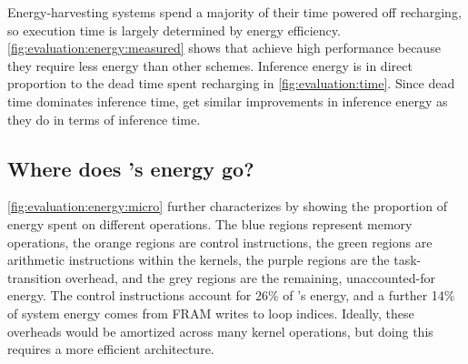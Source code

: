 Energy-harvesting systems spend a majority of their time powered off
recharging, so execution time is largely determined by energy
efficiency.
%
\autoref{fig:evaluation:energy:measured} shows that \sonictails achieve high performance 
because they require less energy than other schemes.
%
Inference energy is in direct proportion to the dead
time spent recharging in \autoref{fig:evaluation:time}.
%
Since dead time dominates inference time, \sonictails get similar
improvements in inference energy as they do in terms of inference
time.

\subsection{Where does \sonic's energy go?}
\autoref{fig:evaluation:energy:micro} further characterizes \sonic by showing 
the proportion of energy spent on different operations. 
%
The blue regions represent memory operations, the orange regions are control
instructions, the green regions are arithmetic instructions within the kernels,
the purple regions are the task-transition overhead, and the grey regions
are the remaining, unaccounted-for energy. 
%
The control instructions account for 26\% of \sonic's energy,
and a further 14\% of system energy comes from FRAM writes to loop indices.
Ideally, these overheads would be amortized across many kernel operations,
but doing this requires a more efficient architecture.
